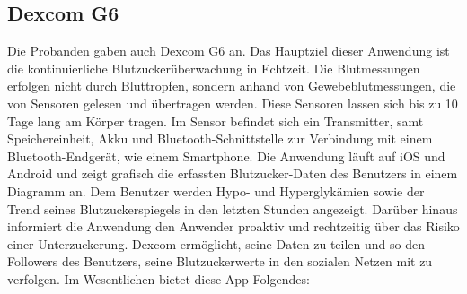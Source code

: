 	\subsection{Dexcom G6}
	Die Probanden gaben auch Dexcom G6 an. Das Hauptziel dieser Anwendung ist die kontinuierliche Blutzuckerüberwachung in Echtzeit. Die Blutmessungen erfolgen nicht durch Bluttropfen, sondern anhand von Gewebeblutmessungen, die von Sensoren gelesen und übertragen werden. Diese Sensoren lassen sich bis zu 10 Tage lang am Körper tragen. Im Sensor befindet sich ein Transmitter, samt Speichereinheit, Akku und Bluetooth-Schnittstelle zur Verbindung mit einem Bluetooth-Endgerät, wie einem Smartphone. Die Anwendung läuft auf iOS und Android und zeigt grafisch die erfassten Blutzucker-Daten des Benutzers in einem Diagramm an. Dem Benutzer werden Hypo- und Hyperglykämien sowie der Trend seines Blutzuckerspiegels in den letzten Stunden angezeigt. Darüber hinaus informiert die Anwendung den Anwender proaktiv und rechtzeitig über das Risiko einer Unterzuckerung. Dexcom ermöglicht, seine Daten zu teilen und so den \glqq Followers\grqq{} des Benutzers, seine Blutzuckerwerte in den sozialen Netzen mit zu verfolgen. Im Wesentlichen bietet diese App Folgendes:
	
